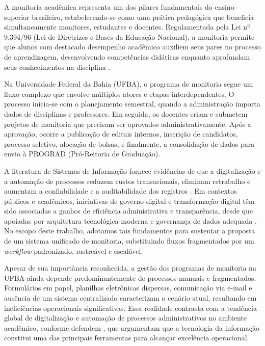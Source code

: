 \documentclass[portuguese]{sbc2025}%
\begin{document}

A monitoria acadêmica representa um dos pilares fundamentais do ensino superior brasileiro, estabelecendo-se como uma prática pedagógica que beneficia simultaneamente monitores, estudantes e docentes. Regulamentada pela Lei nº 9.394/96 (Lei de Diretrizes e Bases da Educação Nacional), a monitoria permite que alunos com destacado desempenho acadêmico auxiliem seus pares no processo de aprendizagem, desenvolvendo competências didáticas enquanto aprofundam seus conhecimentos na disciplina \cite{Brasil1996}.

Na Universidade Federal da Bahia (UFBA), o programa de monitoria segue um fluxo complexo que envolve múltiplos atores e etapas interdependentes. O processo inicia-se com o planejamento semestral, quando a administração importa dados de disciplinas e professores. Em seguida, os docentes criam e submetem projetos de monitoria que precisam ser aprovados administrativamente. Após a aprovação, ocorre a publicação de editais internos, inscrição de candidatos, processo seletivo, alocação de bolsas, e finalmente, a consolidação de dados para envio à PROGRAD (Pró-Reitoria de Graduação).

A literatura de Sistemas de Informação fornece evidências de que a digitalização e a automação de processos reduzem custos transacionais, eliminam retrabalho e aumentam a confiabilidade e a auditabilidade dos registros \cite{Laudon_Laudon_2011, Davenport1993, Hammer1993}. Em contextos públicos e acadêmicos, iniciativas de governo digital e transformação digital têm sido associadas a ganhos de eficiência administrativa e transparência, desde que apoiadas por arquitetura tecnológica moderna e governança de dados adequada \cite{OECD2020, UNESCO2022}. No escopo deste trabalho, adotamos tais fundamentos para sustentar a proposta de um sistema unificado de monitoria, substituindo fluxos fragmentados por um \textit{workflow} padronizado, rastreável e escalável.

Apesar de sua importância reconhecida, a gestão dos programas de monitoria na UFBA ainda depende predominantemente de processos manuais e fragmentados. Formulários em papel, planilhas eletrônicas dispersas, comunicação via e-mail e ausência de um sistema centralizado caracterizam o cenário atual, resultando em ineficiências operacionais significativas. Essa realidade contrasta com a tendência global de digitalização e automação de processos administrativos no ambiente acadêmico, conforme defendem \cite{Laudon_Laudon_2011}, que argumentam que a tecnologia da informação constitui uma das principais ferramentas para alcançar excelência operacional.
\end{document}
